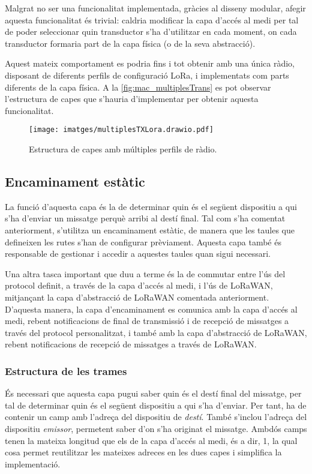 \documentclass{tfgitic}[2024/07/01]
\begin{document}
{Malgrat no ser una funcionalitat implementada, gràcies al disseny modular, afegir aquesta funcionalitat és trivial: caldria modificar la capa d'accés al medi per tal de poder seleccionar quin transductor s'ha d'utilitzar en cada moment, on cada transductor formaria part de la capa física (o de la seva abstracció).

Aquest mateix comportament es podria fins i tot obtenir amb una única ràdio, disposant de diferents perfils de configuració LoRa, i implementats com parts diferents de la capa física. A la \autoref{fig:mac_multiplesTrans} es pot observar l'estructura de capes que s'hauria d'implementar per obtenir aquesta funcionalitat.

\begin{figure}
    \centering
        \texttt{[image: imatges/multiplesTXLora.drawio.pdf]}
    \caption{Estructura de capes amb múltiples perfils de ràdio.}
    \label{fig:mac_multiplesTrans}
\end{figure}


\subsection{Encaminament estàtic}
La funció d'aquesta capa és la de determinar quin és el següent dispositiu a qui s'ha d'enviar un missatge perquè arribi al destí final. Tal com s’ha comentat anteriorment, s’utilitza un encaminament estàtic, de manera que les taules que defineixen les rutes s’han de configurar prèviament. Aquesta capa també és responsable de gestionar i accedir a aquestes taules quan sigui necessari.

Una altra tasca important que duu a terme és la de commutar entre l’ús del protocol definit, a través de la capa d’accés al medi, i l’ús de LoRaWAN, mitjançant la capa d’abstracció de LoRaWAN comentada anteriorment. D’aquesta manera, la capa d’encaminament es comunica amb la capa d’accés al medi, rebent notificacions de final de transmissió i de recepció de missatges a través del protocol personalitzat, i també amb la capa d’abstracció de LoRaWAN, rebent notificacions de recepció de missatges a través de LoRaWAN.

\subsubsection{Estructura de les trames}
És necessari que aquesta capa pugui saber quin és el destí final del missatge, per tal de determinar quin és el següent dispositiu a qui s'ha d'enviar. Per tant, ha de contenir un camp amb l'adreça del dispositiu de \emph{destí}. També s'inclou l'adreça del dispositiu \emph{emissor}, permetent saber d'on s'ha originat el missatge. Ambdós camps tenen la mateixa longitud que els de la capa d’accés al medi, és a dir, \SI{1}{\byte}, la qual cosa permet reutilitzar les mateixes adreces en les dues capes i simplifica la implementació.

}
\end{document}
